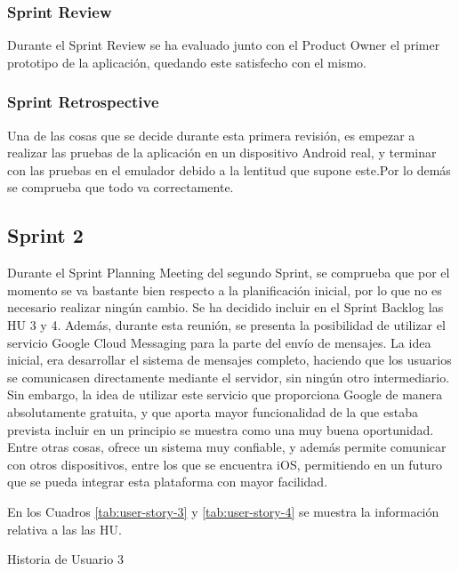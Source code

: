 \subsubsection{Sprint Review}

Durante el Sprint Review se ha evaluado junto con el Product Owner el primer prototipo de la aplicación, quedando este satisfecho con el mismo. 

\subsubsection{Sprint Retrospective}

Una de las cosas que se decide durante esta primera revisión, es empezar a realizar las pruebas de la aplicación en un dispositivo Android real, y terminar con las pruebas en el emulador debido a la lentitud que supone este.Por lo demás se comprueba que todo va correctamente.

\subsection{Sprint 2}

Durante el Sprint Planning Meeting del segundo Sprint, se comprueba que por el momento se va bastante bien respecto a la planificación inicial, por lo que no es necesario realizar ningún cambio. Se ha decidido incluir en el Sprint Backlog las \ac{HU} 3 y 4. Además, durante esta reunión, se presenta la posibilidad de utilizar el servicio Google Cloud Messaging para la parte del envío de mensajes. La idea inicial, era desarrollar el sistema de mensajes completo, haciendo que los usuarios se comunicasen directamente mediante el servidor, sin ningún otro intermediario. Sin embargo, la idea de utilizar este servicio que proporciona Google de manera absolutamente gratuita, y que aporta mayor funcionalidad de la que estaba prevista incluir en un principio se muestra como una muy buena oportunidad. Entre otras cosas, ofrece un sistema muy confiable, y además permite comunicar con otros dispositivos, entre los que se encuentra iOS, permitiendo en un futuro que se pueda integrar esta plataforma con mayor facilidad.

En los Cuadros \ref{tab:user-story-3} y \ref{tab:user-story-4} se muestra la información relativa a las las \ac{HU}.

\begin{table}[hp]
  \centering
  {\small
  
  }
  \caption{Historia de Usuario 3}
  \label{tab:user-story-3}
\end{table}

